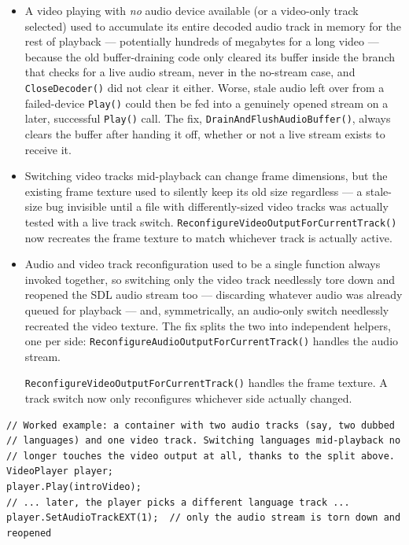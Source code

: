 \begin{itemize}
  \item A video playing with \emph{no} audio device available (or a video-only track selected)
  used to accumulate its entire decoded audio track in memory for the rest of playback ---
  potentially hundreds of megabytes for a long video --- because the old buffer-draining code
  only cleared its buffer inside the branch that checks for a live audio stream, never in the
  no-stream case, and \texttt{CloseDecoder()} did not clear it either. Worse, stale audio left
  over from a failed-device \texttt{Play()} could then be fed into a genuinely opened stream on
  a later, successful \texttt{Play()} call. The fix, \texttt{DrainAndFlushAudioBuffer()}, always
  clears the buffer after handing it off, whether or not a live stream exists to receive it.
  \item Switching video tracks mid-playback can change frame dimensions, but the existing frame
  texture used to silently keep its old size regardless --- a stale-size bug invisible until a
  file with differently-sized video tracks was actually tested with a live track switch.
  \texttt{ReconfigureVideoOutputForCurrentTrack()} now recreates the frame texture to match
  whichever track is actually active.
  \item Audio and video track reconfiguration used to be a single function always invoked
  together, so switching only the video track needlessly tore down and reopened the SDL audio
  stream too --- discarding whatever audio was already queued for playback --- and, symmetrically,
  an audio-only switch needlessly recreated the video texture. The fix splits the two into
  independent helpers, one per side: \texttt{ReconfigureAudioOutputForCurrentTrack()} handles
  the audio stream.

  \texttt{ReconfigureVideoOutputForCurrentTrack()} handles the frame texture. A track switch
  now only reconfigures whichever side actually changed.
\end{itemize}

\begin{lstlisting}
// Worked example: a container with two audio tracks (say, two dubbed
// languages) and one video track. Switching languages mid-playback no
// longer touches the video output at all, thanks to the split above.
VideoPlayer player;
player.Play(introVideo);
// ... later, the player picks a different language track ...
player.SetAudioTrackEXT(1);  // only the audio stream is torn down and reopened
\end{lstlisting}

